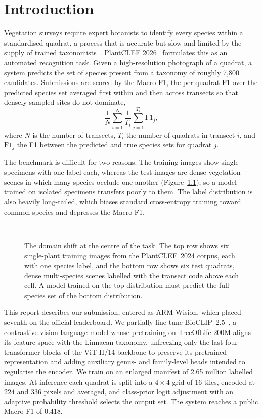 \chapter{Introduction}
\label{sec:introduction}

Vegetation surveys require expert botanists to identify every species within a standardised quadrat, a process that is accurate but slow and limited by the supply of trained taxonomists~\cite{lifeclef2026}. PlantCLEF 2026~\cite{plantclef2026, lifeclef2026} formulates this as an automated recognition task. Given a high-resolution photograph of a quadrat, a system predicts the set of species present from a taxonomy of roughly 7,800 candidates. Submissions are scored by the Macro F1, the per-quadrat F1 over the predicted species set averaged first within and then across transects so that densely sampled sites do not dominate,
\[
  \frac{1}{N}\sum_{i=1}^{N}\frac{1}{T_i}\sum_{j=1}^{T_i}\mathrm{F1}_{j},
\]
where $N$ is the number of transects, $T_i$ the number of quadrats in transect $i$, and $\mathrm{F1}_{j}$ the F1 between the predicted and true species sets for quadrat $j$.

The benchmark is difficult for two reasons. The training images show single specimens with one label each, whereas the test images are dense vegetation scenes in which many species occlude one another (Figure~\ref{fig:domain_shift}), so a model trained on isolated specimens transfers poorly to them. The label distribution is also heavily long-tailed, which biases standard cross-entropy training toward common species and depresses the Macro F1.

\begin{figure}[ht]
  \centering
  \resizebox{\linewidth}{!}{}\\[2pt]
  \resizebox{\linewidth}{!}{}
  \caption{The domain shift at the centre of the task. The top row shows six single-plant training images from the PlantCLEF~2024 corpus, each with one species label, and the bottom row shows six test quadrats, dense multi-species scenes labelled with the transect code above each cell. A model trained on the top distribution must predict the full species set of the bottom distribution.}
  \label{fig:domain_shift}
\end{figure}

This report describes our submission, entered as ARM Wision, which placed seventh on the official leaderboard. We partially fine-tune BioCLIP~2.5~\cite{gu2025bioclip2}, a contrastive vision-language model whose pretraining on TreeOfLife-200M aligns its feature space with the Linnaean taxonomy, unfreezing only the last four transformer blocks of the ViT-H/14 backbone to preserve its pretrained representation and adding auxiliary genus- and family-level heads intended to regularise the encoder. We train on an enlarged manifest of 2.65 million labelled images. At inference each quadrat is split into a $4{\times}4$ grid of 16 tiles, encoded at $224$ and $336$ pixels and averaged, and class-prior logit adjustment with an adaptive probability threshold selects the output set. The system reaches a public Macro F1 of 0.418.
